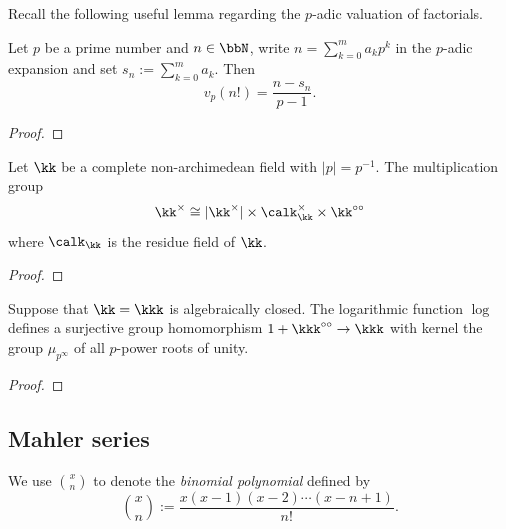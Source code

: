     Recall the following useful lemma regarding the \(p\)-adic valuation of factorials.

    \begin{lemma}\label{lem:p-valuation_of_factorial}
        Let \(p\) be a prime number and \(n \in \bbN\), write \(n = \sum_{k=0}^m a_k p^k\) in the \(p\)-adic expansion and set \(s_n := \sum_{k=0}^m a_k\).
        Then
        \[ v_p(n!) = \frac{n - s_n}{p-1}. \]
    \end{lemma}
    \begin{proof}
    \end{proof}

    \begin{corollary}\label{cor:structure_of_multiplication_group_of_k*}
        Let \(\kk\) be a complete non-archimedean field with \(|p| = p^{-1}\).
        The multiplication group 
        \[ \kk^\times \cong |\kk^\times| \times \calk_\kk^\times \times \kk^{\circ\circ} \]
        where \(\calk_\kk\) is the residue field of \(\kk\).
    \end{corollary}
    \begin{proof}
    \end{proof}

    \begin{proposition}\label{prop:log_on_the_ball_B_11}
        Suppose that \(\kk = \kkk\) is algebraically closed.
        The logarithmic function \(\log\) defines a surjective group homomorphism \(1 + \kkk^{\circ\circ} \to \kkk\) with kernel the group \(\mu_{p^\infty}\) of all \(p\)-power roots of unity.
    \end{proposition}
    \begin{proof}
        
    \end{proof}


\subsection{Mahler series}

    \begin{notation}\label{notation:binomial_polynomial}
        We use \(\binom{x}{n}\) to denote the \emph{binomial polynomial} defined by
        \[ \binom{x}{n} := \frac{x(x-1)(x-2) \cdots (x-n+1)}{n!}. \]
    \end{notation}

